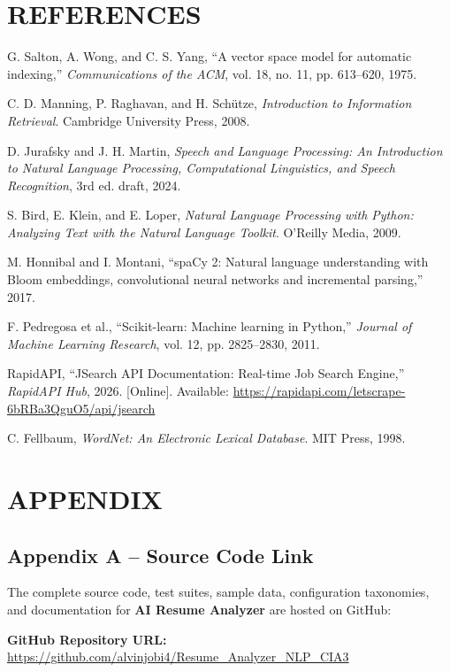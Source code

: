 \documentclass[11pt,a4paper]{article}
\begin{document}
\section*{REFERENCES}

\begin{enumerate}[label={[\arabic*]}, leftmargin=2em, itemsep=0.3cm]
    \item G. Salton, A. Wong, and C. S. Yang, ``A vector space model for automatic indexing,'' \textit{Communications of the ACM}, vol. 18, no. 11, pp. 613--620, 1975.
    \item C. D. Manning, P. Raghavan, and H. Schütze, \textit{Introduction to Information Retrieval}. Cambridge University Press, 2008.
    \item D. Jurafsky and J. H. Martin, \textit{Speech and Language Processing: An Introduction to Natural Language Processing, Computational Linguistics, and Speech Recognition}, 3rd ed. draft, 2024.
    \item S. Bird, E. Klein, and E. Loper, \textit{Natural Language Processing with Python: Analyzing Text with the Natural Language Toolkit}. O'Reilly Media, 2009.
    \item M. Honnibal and I. Montani, ``spaCy 2: Natural language understanding with Bloom embeddings, convolutional neural networks and incremental parsing,'' 2017.
    \item F. Pedregosa et al., ``Scikit-learn: Machine learning in Python,'' \textit{Journal of Machine Learning Research}, vol. 12, pp. 2825--2830, 2011.
    \item RapidAPI, ``JSearch API Documentation: Real-time Job Search Engine,'' \textit{RapidAPI Hub}, 2026. [Online]. Available: \url{https://rapidapi.com/letscrape-6bRBa3QguO5/api/jsearch}
    \item C. Fellbaum, \textit{WordNet: An Electronic Lexical Database}. MIT Press, 1998.
\end{enumerate}

\newpage

\section*{APPENDIX}

\subsection*{Appendix A -- Source Code Link}
The complete source code, test suites, sample data, configuration taxonomies, and documentation for \textbf{AI Resume Analyzer} are hosted on GitHub:
\begin{center}
\textbf{GitHub Repository URL:}\\
\url{https://github.com/alvinjobi4/Resume_Analyzer_NLP_CIA3}
\end{center}
\end{document}
